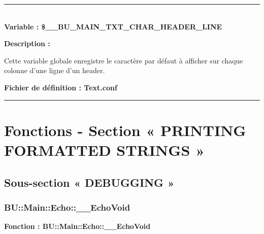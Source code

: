 \documentclass[a4paper,10pt]{article}
\begin{document}

\color{vars}\par\noindent\rule{\textwidth}{0.4pt}\color{text}\\[1\baselineskip]

\textbf{Variable : \color{vars}\$\_\_BU\_MAIN\_TXT\_CHAR\_HEADER\_LINE}\\[1\baselineskip]

\setlength{\parskip}{2em}

\begin{justify}
    \textbf{Description :}
\end{justify}

\setlength{\parskip}{1em}

\begin{justify}
    Cette variable globale enregistre le caractère par défaut à afficher sur chaque colonne d'une ligne d'un header.
\end{justify}

\textbf{Fichier de définition : \color{path}Text.conf}\\[1\baselineskip]





\color{sec1}\par\noindent\rule{\textwidth}{0.4pt}\color{text}

\color{sec1}
\section{Fonctions - Section « PRINTING FORMATTED STRINGS »}\color{text}

\color{sec2}
\subsection{Sous-section « DEBUGGING »}\color{text}

\color{sec3}
\subsubsection{BU::Main::Echo::\_\_EchoVoid}\color{text}

\textbf{Fonction : \color{func}BU::Main::Echo::\_\_EchoVoid}\setlength{\parskip}{1em}
\end{document}
